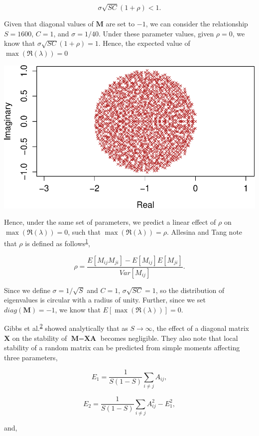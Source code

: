 \documentclass[]{article}
\begin{document}
\[\sigma\sqrt{SC}\left(1 + \rho\right) < 1.\]

Given that diagonal values of \(\textbf{M}\) are set to \(-1\), we can
consider the relationship \(S = 1600\), \(C = 1\), and
\(\sigma = 1/40\). Under these parameter values, given \(\rho = 0\), we
know that \(\sigma\sqrt{SC}\left(1 + \rho\right) = 1\). Hence, the
expected value of \(\max(\Re(\lambda)) = 0\)

\includegraphics{revision_notes_files/figure-latex/unnamed-chunk-11-1.pdf}

Hence, under the same set of parameters, we predict a linear effect of
\(\rho\) on \(\max(\Re(\lambda)) = 0\), such that
\(\max(\Re(\lambda)) = \rho\). Allesina and Tang note that \(\rho\) is
defined as
follows\textsuperscript{\protect\hyperlink{ref-Allesina2015a}{1}},

\[\rho = \frac{E[M_{ij}M_{ji}] - E[M_{ij}]E[M_{ji}]}{Var[M_{ij}]}.\]

Since we define \(\sigma = 1/\sqrt{S}\) and \(C = 1\),
\(\sigma\sqrt{SC} = 1\), so the distribution of eigenvalues is circular
with a radius of unity. Further, since we set \(diag(\textbf{M}) = -1\),
we know that \(E[\max(\Re(\lambda))] = 0\).

Gibbs et al.\textsuperscript{\protect\hyperlink{ref-Gibbs2017}{2}}
showed analytically that as \(S \to \infty\), the effect of a diagonal
matrix \(\textbf{X}\) on the stability of \(\textbf{M} = \textbf{XA}\)
becomes negligible. They also note that local stability of a random
matrix can be predicted from simple moments affecting three parameters,

\[E_{1} = \frac{1}{S(1-S)}\sum_{i \neq j}A_{ij},\]

\[E_{2} = \frac{1}{S(1-S)}\sum_{i \neq j}A^{2}_{ij} - E^{2}_{1},\]

and,
\end{document}
